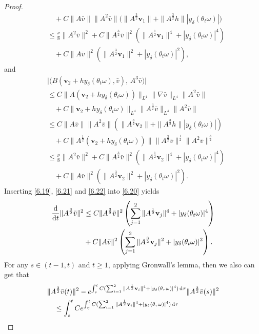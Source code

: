 \documentclass{elsarticle}
\theoremstyle{definition}
\numberwithin{equation}{section}
\renewcommand{\d}{{\rm{d}}}
\begin{document}
\begin{proof}
\begin{align}
&\quad +C\|A\bar{v}\|\|A^2\bar{v}\| \big(\|A^\frac32\textbf{v}_1\|+\|A^\frac32h\||y_\delta(\theta_t\omega)| \big)\nonumber\\
&\leq \frac  \nu 8\|A^2\bar{v}\|^2+C\|A^\frac32\bar{v}\|^2 \left (\|A^\frac12\textbf{v}_1\|^4+|y_\delta(\theta_t\omega)|^4 \right)\nonumber\\
&\quad +C\|A\bar{v}\|^2 \left (\|A^\frac32\textbf{v}_1\|^2+|y_\delta(\theta_t\omega)|^2 \right),
\end{align}
and
\begin{align}\label{6.22}
&\big| \big(B(\textbf{v}_2+hy_\delta(\theta_t\omega),\bar{v}),\, A^3\bar{v}\big)\big|\nonumber\\
&\leq C\|A(\textbf{v}_2+hy_\delta(\theta_t\omega))\|_{L^4}\|\nabla\bar{v}\|_{L^4}\|A^2\bar{v}\| \nonumber\\
&\quad
 +C\|\textbf{v}_2+hy_\delta(\theta_t\omega)\|_{L^4}\|A^\frac32\bar{v}\|_{L^4}\|A^2\bar{v}\|\nonumber\\
&\leq C\|A\bar{v}\|\|A^2\bar{v}\|
\left (\|A^\frac32\textbf{v}_2\|+\|A^\frac32h\||y_\delta(\theta_t\omega)| \right)\nonumber\\
&\quad +C \|A^\frac12(\textbf{v}_2+hy_\delta(\theta_t\omega)
)\|\|A^\frac32\bar{v}\|^\frac12\|A^2\bar{v}\|^\frac32 \nonumber\\
&\leq \frac  \nu 8\|A^2\bar{v}\|^2+C\|A^\frac32\bar{v}\|^2 \left (\|A^\frac12\textbf{v}_2\|^4+|y_\delta(\theta_t\omega)|^4\right)\nonumber\\
&\quad +C\|A\bar{v}\|^2 \left (\|A^\frac32\textbf{v}_2\|^2+|y_\delta(\theta_t\omega)|^2 \right).
\end{align}
Inserting \eqref{6.19}, \eqref{6.21} and \eqref{6.22} into \eqref{6.20} yields
\begin{align*}
\frac{\d}{\d t}\|A^\frac32\bar{v}\|^2
&\leq C\|A^\frac32\bar{v}\|^2 \left ( \sum_{j=1}^2 \|A^\frac12\textbf{v}_j\|^4 +|y_\delta(\theta_t\omega)|^4 \right )
\nonumber\\
 &+C\|A\bar{v}\|^2 \left (\sum_{j=1}^2\|A^\frac32\textbf{v}_j\|^2+|y_\delta(\theta_t\omega)|^2 \right).
\end{align*}
For any $s\in(t-1,t)$ and $t\geq 1$, applying Gronwall's lemma, then  we also can get that
\begin{align*}
&\|A^\frac32\bar{v}(t)\|^2
-e^{\int_s^tC( \sum_{i=1}^2 \|A^\frac12\textbf{v}_i\|^4 +|y_\delta(\theta_\tau\omega)|^4)\, \d \tau}\|A^\frac32\bar{v}(s)\|^2\nonumber\\
&\quad \leq \int_s^tCe^{\int_\eta^tC( \sum_{i=1}^2 \|A^\frac12\textbf{v}_i\|^4+|y_\delta(\theta_\tau\omega)|^4)\, \d \tau}

\end{align*}
\end{proof}
\end{document}
